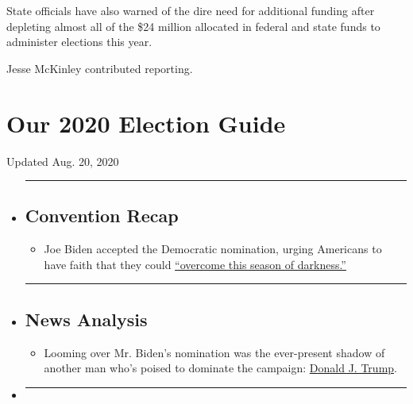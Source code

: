 State officials have also warned of the dire need for additional funding
after depleting almost all of the \$24 million allocated in federal and
state funds to administer elections this year.

Jesse McKinley contributed reporting.

\hypertarget{our-2020-election-guide}{%
\section{Our 2020 Election Guide}\label{our-2020-election-guide}}

Updated Aug. 20, 2020

\begin{itemize}
\item
  \begin{center}\rule{0.5\linewidth}{\linethickness}\end{center}

  \hypertarget{convention-recap}{%
  \subsection{Convention Recap}\label{convention-recap}}

  \begin{itemize}
  \tightlist
  \item
    Joe Biden accepted the Democratic nomination, urging Americans to
    have faith that they could
    \href{https://www.nytimes3xbfgragh.onion/2020/08/20/us/politics/Joe-Biden-accepts-democratic-nomination.html?action=click\&pgtype=Article\&state=default\&region=BELOW_MAIN_CONTENT\&context=storylines_guide}{``overcome
    this season of darkness.''}
  \end{itemize}
\item
  \begin{center}\rule{0.5\linewidth}{\linethickness}\end{center}

  \hypertarget{news-analysis}{%
  \subsection{News Analysis}\label{news-analysis}}

  \begin{itemize}
  \tightlist
  \item
    Looming over Mr. Biden's nomination was the ever-present shadow of
    another man who's poised to dominate the campaign:
    \href{https://www.nytimes3xbfgragh.onion/2020/08/20/us/politics/biden-dnc-speech-trump.html?action=click\&pgtype=Article\&state=default\&region=BELOW_MAIN_CONTENT\&context=storylines_guide}{Donald
    J. Trump}.
  \end{itemize}
\item
  \begin{center}\rule{0.5\linewidth}{\linethickness}\end{center}


\end{itemize}
